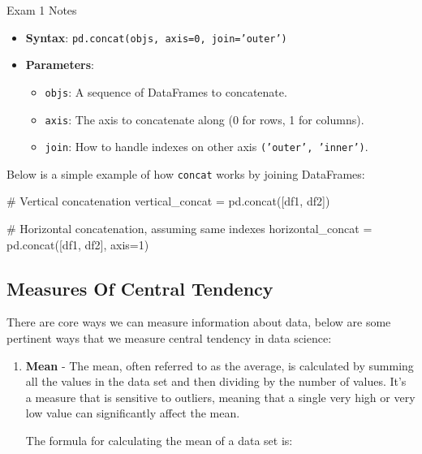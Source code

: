 \begin{examnotes}{Exam 1 Notes}
\begin{enumerate}
\begin{itemize}
            \item \textbf{Syntax}: \texttt{pd.concat(objs, axis=0, join='outer')}
            \item \textbf{Parameters}:
            \begin{itemize}
                \item \texttt{objs}: A sequence of DataFrames to concatenate.
                \item \texttt{axis}: The axis to concatenate along (0 for rows, 1 for columns).
                \item \texttt{join}: How to handle indexes on other axis \texttt{('outer', 'inner')}.
            \end{itemize}
        \end{itemize}
        \begin{highlight}
            Below is a simple example of how \texttt{concat} works by joining DataFrames:
    \begin{code}[Python]
    # Vertical concatenation
    vertical_concat = pd.concat([df1, df2])
    
    # Horizontal concatenation, assuming same indexes
    horizontal_concat = pd.concat([df1, df2], axis=1)        
    \end{code}
        \end{highlight}
    \end{enumerate}

    \subsection*{Measures Of Central Tendency}

    There are core ways we can measure information about data, below are some pertinent ways that we measure central tendency in data science:

    \begin{enumerate}
        \item \textbf{Mean} - The mean, often referred to as the average, is calculated by summing all the values in the data set and then dividing by the number of values. It's a measure that is 
        sensitive to outliers, meaning that a single very high or very low value can significantly affect the mean.

        The formula for calculating the mean of a data set is:


\end{enumerate}
\end{examnotes}
